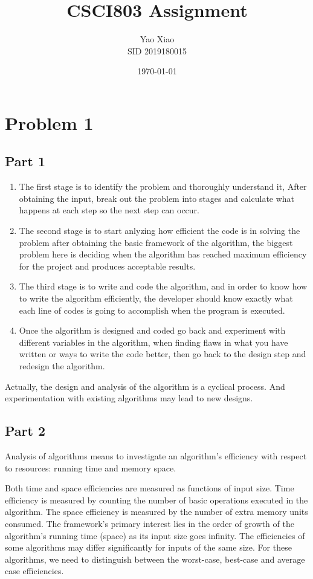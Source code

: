 \documentclass{article}
\title{CSCI803 Assignment}
\author{Yao Xiao \\ SID 2019180015}
\date{\today}
\begin{document}
\maketitle

\section{Problem 1}
\subsection{Part 1}
\begin{enumerate}
    \item The first stage is to identify the problem and thoroughly understand it, After obtaining the input, break out the problem into stages and calculate what happens at each step so the next step can occur.
    \item The second stage is to start anlyzing how efficient the code is in solving the problem after obtaining the basic framework of the algorithm, the biggest problem here is deciding when the algorithm has reached maximum efficiency for the project and produces acceptable results. 
    \item The third stage is to write and code the algorithm, and in order to know how to write the algorithm efficiently, the developer should know exactly what each line of codes is going to accomplish when the program is executed.
    \item Once the algorithm is designed and coded go back and experiment with different variables in the algorithm, when finding flaws in what you have written or ways to write the code better, then go back to the design step and redesign the algorithm.
\end{enumerate}

Actually, the design and analysis of the algorithm is a cyclical process.
And experimentation with existing algorithms may lead to new designs.

\subsection{Part 2}
Analysis of algorithms means to investigate an algorithm’s
efficiency with respect to resources: running time and memory space.

Both time and space efficiencies are measured as functions of input
size. Time efficiency is measured by counting the number of basic
operations executed in the algorithm. The space efficiency is
measured by the number of extra memory units consumed.
The framework’s primary interest lies in the order of growth of the
algorithm’s running time (space) as its input size goes infinity.
The efficiencies of some algorithms may differ significantly for
inputs of the same size. For these algorithms, we need to distinguish
between the worst-case, best-case and average case efficiencies.
\end{document}
